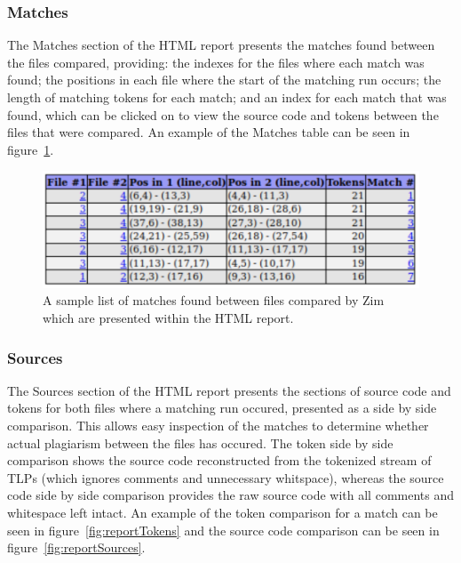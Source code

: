 \documentclass[11pt, a4paper]{article}
\begin{document}
\subsubsection{Matches}

The Matches section of the HTML report presents the matches found between the files compared, providing: the indexes for the files where each match was found; the positions in each file where the start of the matching run occurs; the length of matching tokens for each match; and an index for each match that was found, which can be clicked on to view the source code and tokens between the files that were compared. An example of the Matches table can be seen in figure~\ref{fig:reportMatches}.

\begin{figure}
\begin{center}
\includegraphics[scale=0.86]{ReportMatches}
\end{center}
\caption{\label{fig:reportMatches}A sample list of matches found between files compared by Zim which are presented within the HTML report.}
\end{figure}

\subsubsection{Sources}

The Sources section of the HTML report presents the sections of source code and tokens for both files where a matching run occured, presented as a side by side comparison. This allows easy inspection of the matches to determine whether actual plagiarism between the files has occured. The token side by side comparison shows the source code reconstructed from the tokenized stream of TLPs (which ignores comments and unnecessary whitspace), whereas the source code side by side comparison provides the raw source code with all comments and whitespace left intact. An example of the token comparison for a match can be seen in figure~\ref{fig:reportTokens} and the source code comparison can be seen in figure~\ref{fig:reportSources}.
\end{document}

